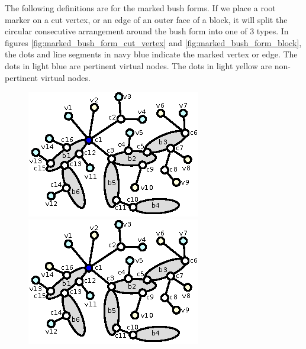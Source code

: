 \documentclass[a4]{jgaa-art}
\begin{document}
The following definitions are for the marked bush forms.
If we place a root marker on a cut vertex, or an edge of an outer face of a block,
it will split the circular consecutive arrangement around the bush form into one
of 3 types. In figures \ref{fig:marked_bush_form_cut_vertex} and
\ref{fig:marked_bush_form_block}, the dots and line segments in navy blue indicate
the marked vertex or edge. The dots in light blue are pertinent virtual nodes.
The dots in light yellow are non-pertinent virtual nodes.

\begin{figure}[!htb]
  \centering
  \begin{minipage}[b]{0.3\textwidth}
    \includegraphics[width=\textwidth]{marked_bush_form_01}
  \end{minipage}
  \hfill
  \begin{minipage}[b]{0.3\textwidth}
    \includegraphics[width=\textwidth]{marked_bush_form_02}

\end{minipage}
\end{figure}
\end{document}
